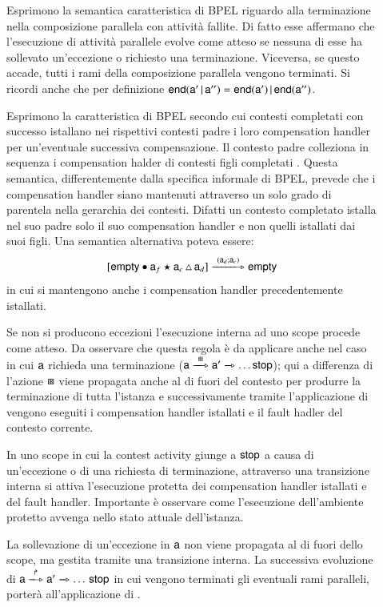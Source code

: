 \begin{description}
  
  \item[ ] Esprimono la semantica
  caratteristica di BPEL riguardo alla terminazione nella composizione
  parallela con attività fallite. Di fatto esse affermano che l'esecuzione di
  attività parallele evolve come atteso se nessuna di esse ha sollevato
  un'eccezione o richiesto una terminazione. Viceversa, se questo accade, tutti
  i rami della composizione parallela vengono terminati. Si ricordi anche che 
  per definizione ${\sf end}( {\sf a}' \,|\, {\sf a}'' ) =  {\sf end}({\sf a}') \,|\,
  {\sf end}({\sf a}'')$.
  
  \item[ ] Esprimono la caratteristica
  di BPEL secondo cui contesti completati con successo istallano nei rispettivi
  contesti padre i loro compensation handler per un'eventuale successiva
  compensazione. Il contesto padre colleziona in sequenza i compensation halder
  di contesti figli completati . Questa
  semantica, differentemente dalla specifica informale di BPEL, prevede che i
  compensation handler siano mantenuti attraverso un solo grado di parentela
  nella gerarchia dei contesti. Difatti un contesto completato istalla nel suo
  padre solo il suo compensation handler e non quelli istallati dai suoi figli.
  Una semantica alternativa poteva essere:
  $$
  \xinstnostate{\xsigma}{\xscope{\xskip}{\xs_f}{\xs_c}{\xs_d}}
\bpeltsarrow{\xdonel{\xs_d;\xs_c}}
\xinstnostate{\xsigma}{\xskip} 
  $$
  in cui si mantengono anche i compensation handler precedentemente istallati.

  \item[] Se non si producono eccezioni l'esecuzione
  interna ad uno scope procede come atteso. Da osservare che questa regola è da
  applicare anche nel caso in cui ${\sf a}$ richieda una terminazione 
  (${\xs} \bpeltsarrow{\xexitl} \xs' \bpeltsarrow{} \ldots {\xstop}$); qui a
  differenza di  l'azione $\boxast$ viene propagata
  anche al di fuori del contesto per produrre la terminazione di tutta
  l'istanza e successivamente tramite l'applicazione di  vengono eseguiti i
  compensation handler istallati e il fault hadler del contesto corrente.
  
  \item[] In uno scope in cui la contest activity giunge a 
  ${\sf stop}$ a causa di un'eccezione o di una richiesta di terminazione,
  attraverso una transizione interna si attiva l'esecuzione protetta dei
  compensation handler istallati e del fault handler. Importante è osservare
  come l'esecuzione dell'ambiente protetto avvenga nello stato attuale
  dell'istanza.
  
  \item[] La sollevazione di un'eccezione in ${\sf a}$ non
  viene propagata al di fuori dello scope, ma gestita tramite una transizione
  interna.  La successiva evoluzione di ${\xs} \bpeltsarrow{\xthrl} \xs'
  \bpeltsarrow{} \ldots \, {\xstop}$ in cui vengono terminati gli eventuali
  rami paralleli, porterà all'applicazione di . 
\end{description}

